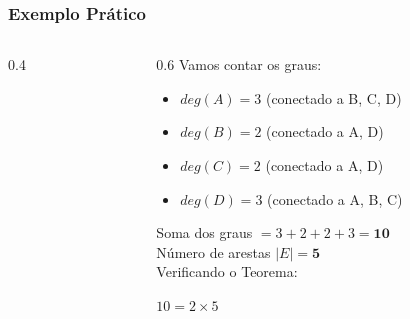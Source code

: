 \documentclass[9pt]{beamer}
\begin{document}
\begin{frame}
    \frametitle{Exemplo Prático}
    \begin{columns}
        \begin{column}{0.4\textwidth}
            \begin{center}
            \end{center}
        \end{column}
        \begin{column}{0.6\textwidth}
            Vamos contar os graus:
            \begin{itemize}
                \item $deg(A) = 3$ (conectado a B, C, D)
                \item $deg(B) = 2$ (conectado a A, D)
                \item $deg(C) = 2$ (conectado a A, D)
                \item $deg(D) = 3$ (conectado a A, B, C)
            \end{itemize}
            \vspace{0.3cm}
            Soma dos graus $= 3 + 2 + 2 + 3 = \mathbf{10}$ \\
            Número de arestas $|E| = \mathbf{5}$
            \vspace{0.3cm}
            \\Verificando o Teorema:
            \begin{center}
                $10 = 2 \times 5$
            \end{center}
        \end{column}
    \end{columns}
\end{frame}
\end{document}

